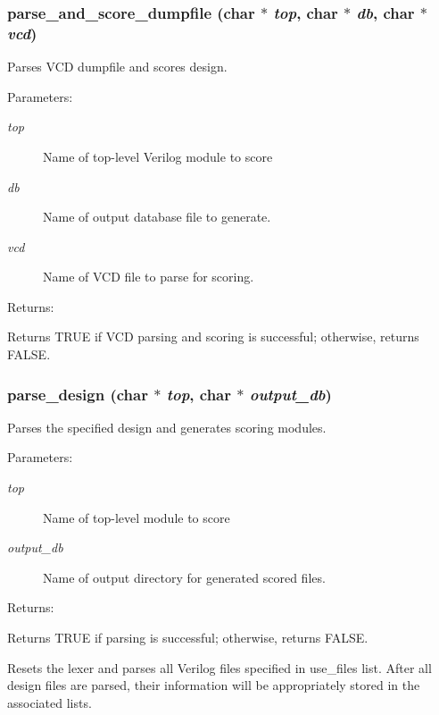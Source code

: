 \subsubsection{ parse\_\-and\_\-score\_\-dumpfile (char $\ast$ {\em top}, char $\ast$ {\em db}, char $\ast$ {\em vcd})}\label{parse_8h_a1}


Parses VCD dumpfile and scores design.

\begin{Desc}
\item[Parameters: ]\par
\begin{description}
\item[{\em 
top}]Name of top-level Verilog module to score \item[{\em 
db}]Name of output database file to generate. \item[{\em 
vcd}]Name of VCD file to parse for scoring. \end{description}
\end{Desc}
\begin{Desc}
\item[Returns: ]\par
Returns TRUE if VCD parsing and scoring is successful; otherwise, returns FALSE. \end{Desc}
\subsubsection{ parse\_\-design (char $\ast$ {\em top}, char $\ast$ {\em output\_\-db})}\label{parse_8h_a0}


Parses the specified design and generates scoring modules.

\begin{Desc}
\item[Parameters: ]\par
\begin{description}
\item[{\em 
top}]Name of top-level module to score \item[{\em 
output\_\-db}]Name of output directory for generated scored files.\end{description}
\end{Desc}
\begin{Desc}
\item[Returns: ]\par
Returns TRUE if parsing is successful; otherwise, returns FALSE.\end{Desc}
Resets the lexer and parses all Verilog files specified in use\_\-files list. After all design files are parsed, their information will be appropriately stored in the associated lists. 